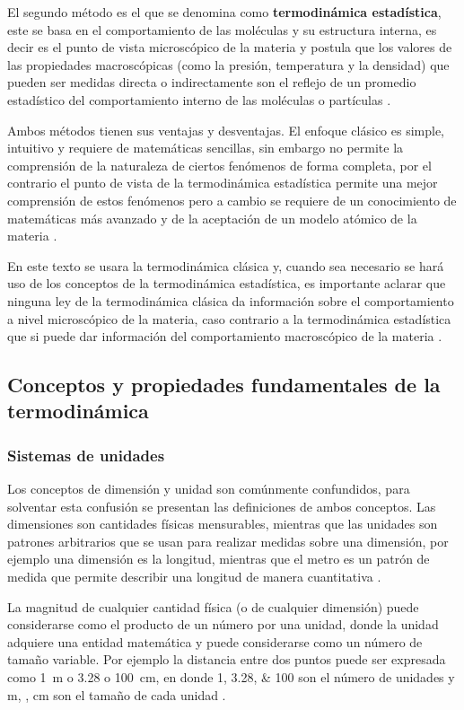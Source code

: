 \documentclass[../master.tex]{subfiles}
\begin{document}
El segundo método es el que se denomina como \textbf{termodinámica estadística}, este se basa en el comportamiento de las moléculas y su estructura interna, es decir es el punto de vista microscópico de la materia y postula que los valores de las propiedades macroscópicas (como la presión, temperatura y la densidad) que pueden ser medidas directa o indirectamente son el reflejo de un promedio estadístico del comportamiento interno de las moléculas o partículas \parencites{faires}{wark}.

Ambos métodos tienen sus ventajas y desventajas. El enfoque clásico es simple, intuitivo y requiere de matemáticas sencillas, sin embargo no permite la comprensión de la naturaleza de ciertos fenómenos de forma completa, por el contrario el punto de vista de la termodinámica estadística permite una mejor comprensión de estos fenómenos pero a cambio se requiere de un conocimiento de matemáticas más avanzado y de la aceptación de un modelo atómico de la materia \parencite{faires}.

En este texto se usara la termodinámica clásica y, cuando sea necesario se hará uso de los conceptos de la termodinámica estadística, es importante aclarar que ninguna ley de la termodinámica clásica da información sobre el comportamiento a nivel microscópico de la materia, caso contrario a la termodinámica estadística que si puede dar información del comportamiento macroscópico de la materia \parencite{smith-vanness}.

\subsection{Conceptos y propiedades fundamentales de la termodinámica}

\subsubsection{Sistemas de unidades}

Los conceptos de dimensión y unidad son comúnmente confundidos, para solventar esta confusión se presentan las definiciones de ambos conceptos. Las dimensiones son cantidades físicas mensurables, mientras que las unidades son patrones arbitrarios que se usan para realizar medidas sobre una dimensión, por ejemplo una dimensión es la longitud, mientras que el metro es un patrón de medida que permite describir una longitud de manera cuantitativa \parencites{rubenstein}{doran}.


La magnitud de cualquier cantidad física (o de cualquier dimensión) puede considerarse como el producto de un número por una unidad, donde la unidad adquiere una entidad matemática y puede considerarse como un número de tamaño variable. Por ejemplo la distancia entre dos puntos puede ser expresada como \qty{1}{\metre} o \qty{3.28}{\feet} o \qty{100}{\centi\metre}, en donde \numlist{1;3.28;100} son el número de unidades y \unit{m}, \unit{\feet}, \unit{\centi\metre} son el tamaño de cada unidad \parencite{coulson1}.
\end{document}
